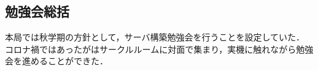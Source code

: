 \subsection*{勉強会総括}


本局では秋学期の方針として，サーバ構築勉強会を行うことを設定していた．
コロナ禍ではあったが\firstGrade{}はサークルルームに対面で集まり，実機に触れながら勉強会を進めることができた．
